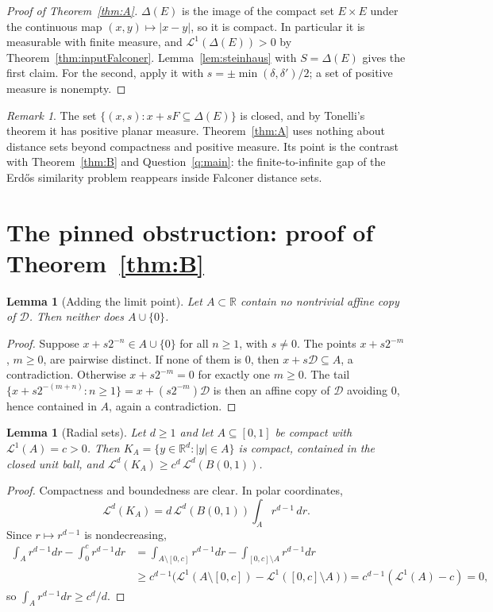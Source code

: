 \documentclass[11pt]{amsart}
\newtheorem{lemma}[theorem]{Lemma}
\theoremstyle{definition}
\theoremstyle{remark}
\newtheorem{remark}[theorem]{Remark}
\newcommand{\R}{\mathbb{R}}
\newcommand{\Lm}{\mathcal{L}}
\newcommand{\Dy}{\mathcal{D}}
\begin{document}
\begin{proof}[Proof of Theorem~\ref{thm:A}]
$\Delta(E)$ is the image of the compact set $E\times E$ under the continuous map
$(x,y)\mapsto|x-y|$, so it is compact. In particular it is measurable with finite measure, and
$\Lm^1(\Delta(E))>0$ by Theorem~\ref{thm:inputFalconer}. Lemma~\ref{lem:steinhaus} with $S=\Delta(E)$ gives the first
claim. For the second, apply it with $s=\pm\min(\delta,\delta')/2$; a set of positive measure is
nonempty.
\end{proof}

\begin{remark}
The set $\{(x,s):x+sF\subseteq\Delta(E)\}$ is closed, and by Tonelli's theorem it has positive
planar measure. Theorem~\ref{thm:A} uses nothing about distance sets beyond compactness and positive measure. Its
point is the contrast with Theorem~\ref{thm:B} and Question~\ref{q:main}: the finite-to-infinite gap
of the Erd\H{o}s similarity problem reappears inside Falconer distance sets.
\end{remark}

\section{The pinned obstruction: proof of Theorem~\ref{thm:B}}

\begin{lemma}[Adding the limit point]\label{lem:zero}
Let $A\subset\R$ contain no nontrivial affine copy of $\Dy$. Then neither does $A\cup\{0\}$.
\end{lemma}

\begin{proof}
Suppose $x+s2^{-n}\in A\cup\{0\}$ for all $n\ge1$, with $s\ne0$. The points $x+s2^{-m}$, $m\ge0$,
are pairwise distinct. If none of them is $0$, then $x+s\Dy\subseteq A$, a contradiction. Otherwise
$x+s2^{-m}=0$ for exactly one $m\ge0$. The tail $\{x+s2^{-(m+n)}:n\ge1\}=x+(s2^{-m})\Dy$ is then
an affine copy of $\Dy$ avoiding $0$, hence contained in $A$, again a contradiction.
\end{proof}

\begin{lemma}[Radial sets]\label{lem:radial}
Let $d\ge1$ and let $A\subseteq[0,1]$ be compact with $\Lm^1(A)=c>0$. Then
$K_A=\{y\in\R^d:|y|\in A\}$ is compact, contained in the closed unit ball, and
$\Lm^d(K_A)\ge c^d\,\Lm^d(B(0,1))$.
\end{lemma}

\begin{proof}
Compactness and boundedness are clear. In polar coordinates,
\[
  \Lm^d(K_A)=d\,\Lm^d(B(0,1))\int_A r^{d-1}\,dr .
\]
Since $r\mapsto r^{d-1}$ is nondecreasing,
\begin{align*}
  \int_A r^{d-1}dr-\int_0^c r^{d-1}dr
  &=\int_{A\setminus[0,c]}r^{d-1}dr-\int_{[0,c]\setminus A}r^{d-1}dr\\
  &\ge c^{d-1}\bigl(\Lm^1(A\setminus[0,c])-\Lm^1([0,c]\setminus A)\bigr)=c^{d-1}(\Lm^1(A)-c)=0,
\end{align*}
so $\int_A r^{d-1}dr\ge c^d/d$.
\end{proof}
\end{document}
